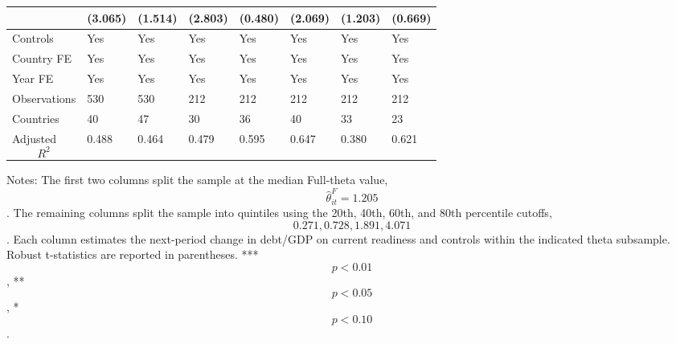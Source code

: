 \begin{table}[H]
\begin{threeparttable}
\begin{tabularx}{\textwidth}{lYYYYYYY}
  & (3.065) & (1.514) & (2.803) & (0.480) & (2.069) & (1.203) & (0.669) \\
\midrule
Controls & Yes & Yes & Yes & Yes & Yes & Yes & Yes \\
Country FE & Yes & Yes & Yes & Yes & Yes & Yes & Yes \\
Year FE & Yes & Yes & Yes & Yes & Yes & Yes & Yes \\
Observations & 530 & 530 & 212 & 212 & 212 & 212 & 212 \\
Countries & 40 & 47 & 30 & 36 & 40 & 33 & 23 \\
Adjusted $$R^2$$ & 0.488 & 0.464 & 0.479 & 0.595 & 0.647 & 0.380 & 0.621 \\
\bottomrule
\end{tabularx}
\begin{tablenotes}[flushleft]\footnotesize
\item Notes: The first two columns split the sample at the median Full-theta value, $$\widehat{\theta}^{F}_{it}=1.205$$. The remaining columns split the sample into quintiles using the 20th, 40th, 60th, and 80th percentile cutoffs, $$0.271, 0.728, 1.891, 4.071$$. Each column estimates the next-period change in debt/GDP on current readiness and controls within the indicated theta subsample. Robust t-statistics are reported in parentheses. *** $$p<0.01$$, ** $$p<0.05$$, * $$p<0.10$$.
\end{tablenotes}
\end{threeparttable}
\end{table}
